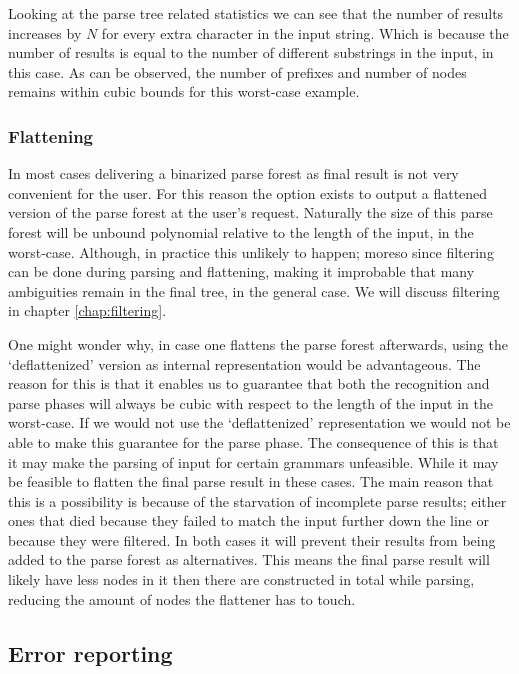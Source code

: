 \documentclass[a4paper,10pt]{article}
\begin{document}
Looking at the parse tree related statistics we can see that the number of results increases by $N$ for every extra character in the input string. Which is because the number of results is equal to the number of different substrings in the input, in this case. As can be observed, the number of prefixes and number of nodes remains within cubic bounds for this worst-case example.

\subsubsection{Flattening}
\label{subsec:Flattening}
In most cases delivering a binarized parse forest as final result is not very convenient for the user. For this reason the option exists to output a flattened version of the parse forest at the user's request. Naturally the size of this parse forest will be unbound polynomial relative to the length of the input, in the worst-case. Although, in practice this unlikely to happen; moreso since filtering can be done during parsing and flattening, making it improbable that many ambiguities remain in the final tree, in the general case. We will discuss filtering in chapter \ref{chap:filtering}.

One might wonder why, in case one flattens the parse forest afterwards, using the `deflattenized' version as internal representation would be advantageous. The reason for this is that it enables us to guarantee that both the recognition and parse phases will always be cubic with respect to the length of the input in the worst-case. If we would not use the `deflattenized' representation we would not be able to make this guarantee for the parse phase. The consequence of this is that it may make the parsing of input for certain grammars unfeasible. While it may be feasible to flatten the final parse result in these cases. The main reason that this is a possibility is because of the starvation of incomplete parse results; either ones that died because they failed to match the input further down the line or because they were filtered. In both cases it will prevent their results from being added to the parse forest as alternatives. This means the final parse result will likely have less nodes in it then there are constructed in total while parsing, reducing the amount of nodes the flattener has to touch.

\subsection{Error reporting}
\end{document}
